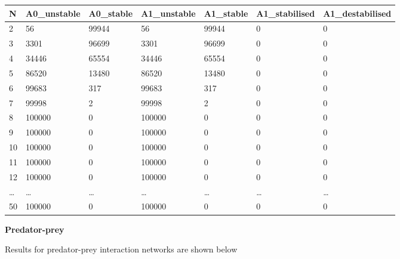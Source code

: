 \documentclass[]{article}
\begin{document}
\begin{longtable}[]{@{}lllllll@{}}
\toprule
N & A0\_unstable & A0\_stable & A1\_unstable & A1\_stable &
A1\_stabilised & A1\_destabilised\tabularnewline
\midrule
\endhead
2 & 56 & 99944 & 56 & 99944 & 0 & 0\tabularnewline
3 & 3301 & 96699 & 3301 & 96699 & 0 & 0\tabularnewline
4 & 34446 & 65554 & 34446 & 65554 & 0 & 0\tabularnewline
5 & 86520 & 13480 & 86520 & 13480 & 0 & 0\tabularnewline
6 & 99683 & 317 & 99683 & 317 & 0 & 0\tabularnewline
7 & 99998 & 2 & 99998 & 2 & 0 & 0\tabularnewline
8 & 100000 & 0 & 100000 & 0 & 0 & 0\tabularnewline
9 & 100000 & 0 & 100000 & 0 & 0 & 0\tabularnewline
10 & 100000 & 0 & 100000 & 0 & 0 & 0\tabularnewline
11 & 100000 & 0 & 100000 & 0 & 0 & 0\tabularnewline
12 & 100000 & 0 & 100000 & 0 & 0 & 0\tabularnewline
\ldots{} & \ldots{} & \ldots{} & \ldots{} & \ldots{} & \ldots{} &
\ldots{}\tabularnewline
50 & 100000 & 0 & 100000 & 0 & 0 & 0\tabularnewline
\bottomrule
\end{longtable}

\textbf{Predator-prey}

Results for predator-prey interaction networks are shown below
\end{document}
